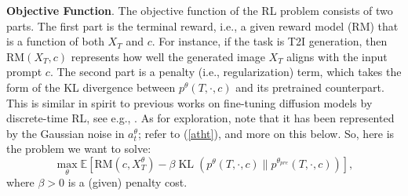 \documentclass{article}
\theoremstyle{plain}
\theoremstyle{definition}
\theoremstyle{remark}
\begin{document}
\textbf{Objective Function}. 
The objective function of the RL problem consists of two parts. The first part is the terminal reward, i.e., a given
reward model (RM) that is a function of both $X_T$ and $c$. 
For instance, if the task is T2I generation, then $\text{RM}(X_T,c)$ represents how well the generated image $X_T$ aligns with the input prompt $c$. The second part is a penalty (i.e., regularization) term, which takes the form of the KL divergence between $p^{\theta}(T,\cdot,c)$ and its pretrained counterpart. 
This is similar in spirit to previous works on fine-tuning diffusion models by discrete-time RL, see e.g., \cite{ouyang2022training,DPOK}.
As for exploration, note that it has been represented by the Gaussian noise in $a^\theta_t$; refer to (\ref{atht}), and more on this below. So, here is the problem we want to solve:
\begin{equation}
\label{objective with regularization}
\max_\theta \mathbb{E}\left[\text{RM}(c,X^{\theta}_T)-\beta \operatorname{KL}\left(p^{\theta}(T,\cdot,c)\| p^{\theta_{pre}}(T,\cdot,c)\right)\right],
\end{equation}
where $\beta>0$ is a (given) penalty cost.
\end{document}
